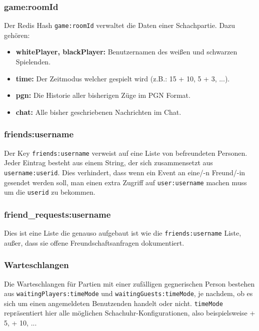 \subsubsection{game:roomId}
\label{sec:game:roomId}
Der Redis Hash \verb|game:roomId| verwaltet die Daten einer Schachpartie. Dazu gehören:
\begin{itemize}
\item \textbf{whitePlayer, blackPlayer:} Benutzernamen des weißen und schwarzen Spielenden.
\item \textbf{time:} Der Zeitmodus welcher gespielt wird (z.B.: 15 + 10, 5 + 3, ...).
\item \textbf{pgn:} Die Historie aller bisherigen Züge im PGN Format.
\item \textbf{chat:} Alle bisher geschriebenen Nachrichten im Chat.
\end{itemize}

\subsubsection{friends:username}
\label{sec:friends:username}
Der Key \verb|friends:username| verweist auf eine Liste von befreundeten Personen. Jeder Eintrag besteht aus einem String, der sich zusammensetzt aus \verb|username:userid|. Dies verhindert, dass wenn ein Event an eine/-n Freund/-in gesendet werden soll, man einen extra Zugriff auf \verb|user:username| machen muss um die \verb|userid| zu bekommen.

\subsubsection{friend\_requests:username}
Dies ist eine Liste die genauso aufgebaut ist wie die \verb|friends:username| Liste, außer, dass sie offene Freundschaftsanfragen dokumentiert.

\subsubsection{Warteschlangen}
\label{sec:Warteschlange}
Die Warteschlangen für Partien mit einer zufälligen gegnerischen Person bestehen aus \linebreak \verb|waitingPlayers:timeMode| und \verb|waitingGuests:timeMode|, je nachdem, ob es sich um einen angemeldeten Benutzenden handelt oder nicht. \verb|timeMode| repräsentiert hier alle möglichen Schachuhr-Konfigurationen, also beispielsweise  + 5\grqq ,  + 10\grqq , ...

